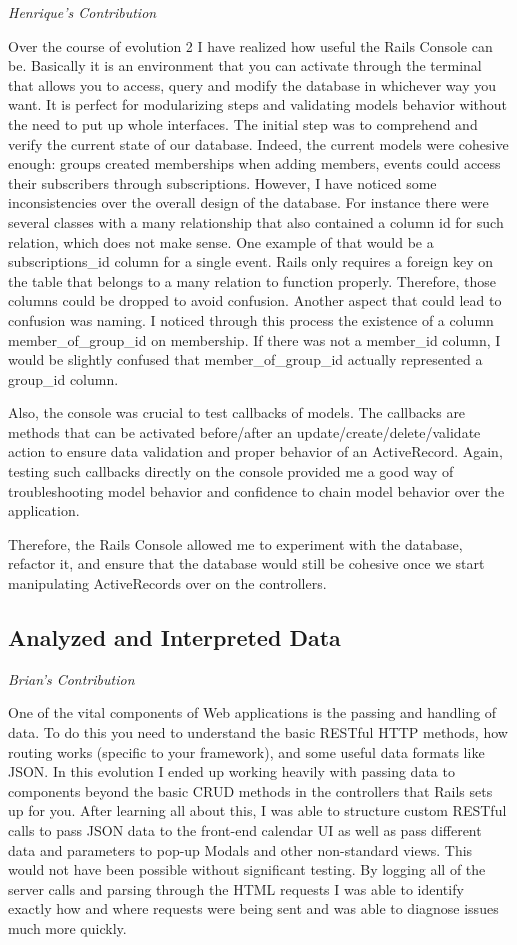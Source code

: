 \documentclass[11pt]{article}
\begin{document}
\textit{Henrique's Contribution}

Over the course of evolution 2 I have realized how useful the Rails Console can be. Basically it is an environment that you can activate through the terminal that allows you to access, query and modify the database in whichever way you want. It is perfect for modularizing steps and validating models behavior without the need to put up whole interfaces. The initial step was to comprehend and verify the current state of our database. Indeed, the current models were cohesive enough: groups created memberships when adding members, events could access their subscribers through subscriptions. However, I have noticed some inconsistencies over the overall design of the database. For instance there were several classes with a many relationship that also contained a column id for such relation, which does not make sense. One example of that would be a subscriptions\_id column for a single event. Rails only requires a foreign key on the table that belongs to a many relation to function properly. Therefore, those columns could be dropped to avoid confusion. Another aspect that could lead to confusion was naming. I noticed through this process the existence of a column member\_of\_group\_id on membership. If there was not a member\_id column, I would be slightly confused that member\_of\_group\_id actually represented a group\_id column.

Also, the console was crucial to test callbacks of models. The callbacks are methods that can be activated before/after an update/create/delete/validate action to ensure data validation and proper behavior of an ActiveRecord. Again, testing such callbacks directly on the console provided me a good way of troubleshooting model behavior and confidence to chain model behavior over the application.

Therefore, the Rails Console allowed me to experiment with the database, refactor it, and ensure that the database would still be cohesive once we start manipulating ActiveRecords over on the controllers.

\subsection{Analyzed and Interpreted Data}

\textit{Brian's Contribution}

One of the vital components of Web applications is the passing and handling of data. To do this you need to understand the basic RESTful HTTP methods, how routing works (specific to your framework), and some useful data formats like JSON. In this evolution I ended up working heavily with passing data to components beyond the basic CRUD methods in the controllers that Rails sets up for you. After learning all about this, I was able to structure custom RESTful calls to pass JSON data to the front-end calendar UI as well as pass different data and parameters to pop-up Modals and other non-standard views. This would not have been possible without significant testing. By logging all of the server calls and parsing through the HTML requests I was able to identify exactly how and where requests were being sent and was able to diagnose issues much more quickly. 
\end{document}
